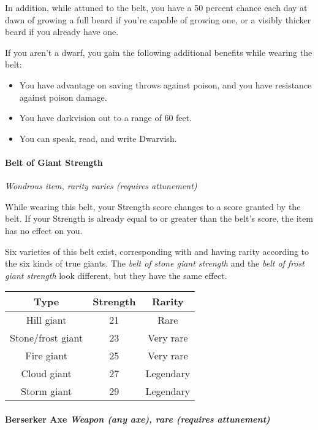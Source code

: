 \documentclass[
]{article}
\begin{document}
In addition, while attuned to the belt, you have a 50 percent chance
each day at dawn of growing a full beard if you're capable of growing
one, or a visibly thicker beard if you already have one.

If you aren't a dwarf, you gain the following additional benefits while
wearing the belt:

\begin{itemize}
\item
  You have advantage on saving throws against poison, and you have
  resistance against poison damage.
\item
  You have darkvision out to a range of 60 feet.
\item
  You can speak, read, and write Dwarvish.
\end{itemize}

\hypertarget{belt-of-giant-strength}{%
\paragraph{Belt of Giant Strength}\label{belt-of-giant-strength}}

\emph{Wondrous item, rarity varies (requires attunement)}

While wearing this belt, your Strength score changes to a score granted
by the belt. If your Strength is already equal to or greater than the
belt's score, the item has no effect on you.

Six varieties of this belt exist, corresponding with and having rarity
according to the six kinds of true giants. The \emph{belt of stone giant
strength} and the \emph{belt of frost giant strength} look different,
but they have the same effect.

\begin{longtable}[]{@{}ccc@{}}
\toprule
Type & Strength & Rarity\tabularnewline
\midrule
\endhead
Hill giant & 21 & Rare\tabularnewline
Stone/frost giant & 23 & Very rare\tabularnewline
Fire giant & 25 & Very rare\tabularnewline
Cloud giant & 27 & Legendary\tabularnewline
Storm giant & 29 & Legendary\tabularnewline
\bottomrule
\end{longtable}

\hypertarget{berserker-axe-weapon-any-axe-rare-requires-attunement}{%
\paragraph{\texorpdfstring{Berserker Axe \emph{Weapon (any axe), rare
(requires
attunement)}}{Berserker Axe Weapon (any axe), rare (requires attunement)}}\label{berserker-axe-weapon-any-axe-rare-requires-attunement}}
\end{document}
